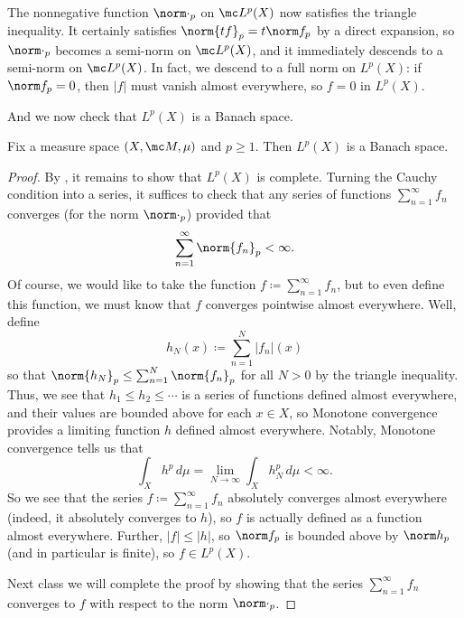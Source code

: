 \documentclass[../notes.tex]{subfiles}
\begin{document}
\begin{remark} \label{rem:lp-norm}
	The nonnegative function $\norm\cdot_p$ on $\mc L^p(X)$ now satisfies the triangle inequality. It certainly satisfies $\norm{tf}_p=t\norm f_p$ by a direct expansion, so $\norm\cdot_p$ becomes a semi-norm on $\mc L^p(X)$, and it immediately descends to a semi-norm on $\mc L^p(X)$. In fact, we descend to a full norm on $L^p(X)$: if $\norm f_p=0$, then $\left|f\right|$ must vanish almost everywhere, so $f=0$ in $L^p(X)$.
\end{remark}
And we now check that $L^p(X)$ is a Banach space.
\begin{theorem}
	Fix a measure space $(X,\mc M,\mu)$ and $p\ge1$. Then $L^p(X)$ is a Banach space.
\end{theorem}
\begin{proof}
	By , it remains to show that $L^p(X)$ is complete. Turning the Cauchy condition into a series, it suffices to check that any series of functions $\sum_{n=1}^\infty f_n$ converges (for the norm $\norm\cdot_p$) provided that
	\[\sum_{n=1}^\infty\norm{f_n}_p<\infty.\]
	Of course, we would like to take the function $f\coloneqq\sum_{n=1}^\infty f_n$, but to even define this function, we must know that $f$ converges pointwise almost everywhere. Well, define
	\[h_N(x)\coloneqq\sum_{n=1}^N\left|f_n\right|(x)\]
	so that $\norm{h_N}_p\le\sum_{n=1}^N\norm{f_n}_p$ for all $N>0$ by the triangle inequality. Thus, we see that $h_1\le h_2\le\cdots$ is a series of functions defined almost everywhere, and their values are bounded above for each $x\in X$, so Monotone convergence provides a limiting function $h$ defined almost everywhere. Notably, Monotone convergence tells us that
	\[\int_Xh^p\,d\mu=\lim_{N\to\infty}\int_Xh_N^p\,d\mu<\infty.\]
	So we see that the series $f\coloneqq\sum_{n=1}^\infty f_n$ absolutely converges almost everywhere (indeed, it absolutely converges to $h$), so $f$ is actually defined as a function almost everywhere. Further, $\left|f\right|\le\left|h\right|$, so $\norm f_p$ is bounded above by $\norm h_p$ (and in particular is finite), so $f\in L^p(X)$.

	Next class we will complete the proof by showing that the series $\sum_{n=1}^\infty f_n$ converges to $f$ with respect to the norm $\norm\cdot_p$.
\end{proof}
\end{document}
